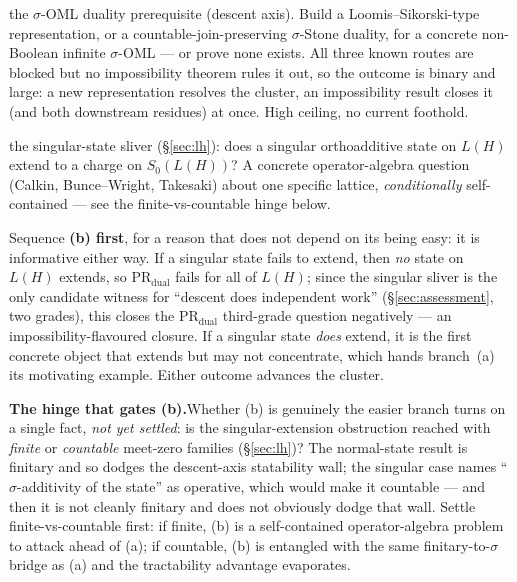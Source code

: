 \documentclass[11pt]{article}
\theoremstyle{definition}
\begin{document}
\begin{description}[style=nextline, font=\normalfont\bfseries,
    labelwidth=2.6cm, leftmargin=3cm]
  \item[(a)~The deep unlock]
    the $\sigma$-OML duality prerequisite (descent axis).  Build a
    Loomis--Sikorski-type representation, or a countable-join-preserving
    $\sigma$-Stone duality, for a concrete non-Boolean infinite
    $\sigma$-OML --- or prove none exists.  All three known routes are
    blocked but no impossibility theorem rules it out, so the outcome is
    binary and large: a new representation resolves the cluster, an
    impossibility result closes it (and both downstream residues) at
    once.  High ceiling, no current foothold.
  \item[(b)~The tractable special case]
    the singular-state sliver (\S\ref{sec:lh}): does a singular
    orthoadditive state on $L(H)$ extend to a charge on $S_0(L(H))$?
    A concrete operator-algebra question (Calkin, Bunce--Wright,
    Takesaki) about one specific lattice, \emph{conditionally}
    self-contained --- see the finite-vs-countable hinge below.
\end{description}

\noindent
Sequence \textbf{(b) first}, for a reason that does not depend on its
being easy: it is informative either way.  If a singular state fails to
extend, then \emph{no} state on $L(H)$ extends, so $\text{PR}_{\text{dual}}$
fails for all of $L(H)$; since the singular sliver is the only candidate
witness for ``descent does independent work'' (\S\ref{sec:assessment},
two grades), this closes the $\text{PR}_{\text{dual}}$ third-grade
question negatively --- an impossibility-flavoured closure.  If a singular
state \emph{does} extend, it is the first concrete object that extends but
may not concentrate, which hands branch~(a) its motivating example.  Either
outcome advances the cluster.

\medskip\noindent
\textbf{The hinge that gates (b).}\enspace Whether (b) is genuinely the
easier branch turns on a single fact, \emph{not yet settled}: is the
singular-extension obstruction reached with \emph{finite} or
\emph{countable} meet-zero families (\S\ref{sec:lh})?  The normal-state
result is finitary and so dodges the descent-axis statability wall; the
singular case names ``$\sigma$-additivity of the state'' as operative,
which would make it countable --- and then it is not cleanly finitary and
does not obviously dodge that wall.  Settle finite-vs-countable first: if
finite, (b) is a self-contained operator-algebra problem to attack ahead
of (a); if countable, (b) is entangled with the same finitary-to-$\sigma$
bridge as (a) and the tractability advantage evaporates.



\end{document}
